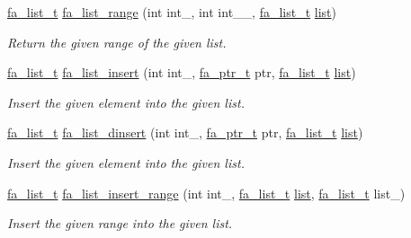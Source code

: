 \begin{DoxyCompactItemize}
\hyperlink{group___fa_list_ga35ecb12ab934ded0cce0bcf28e3bc5d2}{fa\-\_\-list\-\_\-t} \hyperlink{group___fa_list_ga05dc645dd5250b06e8c2957e9e04a2cc}{fa\-\_\-list\-\_\-range} (int int\-\_\-, int int\-\_\-\-\_\-, \hyperlink{group___fa_list_ga35ecb12ab934ded0cce0bcf28e3bc5d2}{fa\-\_\-list\-\_\-t} \hyperlink{literals_8h_a4ddd63dfcfec2b4d5741a56aa6003c76}{list})
\begin{DoxyCompactList}\small\item\em Return the given range of the given list. \end{DoxyCompactList}\item 
\hyperlink{group___fa_list_ga35ecb12ab934ded0cce0bcf28e3bc5d2}{fa\-\_\-list\-\_\-t} \hyperlink{group___fa_list_gaf1b604aca05bc10ba88543868ea48f7a}{fa\-\_\-list\-\_\-insert} (int int\-\_\-, \hyperlink{group___fa_ga915ddeae99ad7568b273d2b876425197}{fa\-\_\-ptr\-\_\-t} ptr, \hyperlink{group___fa_list_ga35ecb12ab934ded0cce0bcf28e3bc5d2}{fa\-\_\-list\-\_\-t} \hyperlink{literals_8h_a4ddd63dfcfec2b4d5741a56aa6003c76}{list})
\begin{DoxyCompactList}\small\item\em Insert the given element into the given list. \end{DoxyCompactList}\item 
\hyperlink{group___fa_list_ga35ecb12ab934ded0cce0bcf28e3bc5d2}{fa\-\_\-list\-\_\-t} \hyperlink{group___fa_list_ga331555c4727341fec8f2f0df6a0e2088}{fa\-\_\-list\-\_\-dinsert} (int int\-\_\-, \hyperlink{group___fa_ga915ddeae99ad7568b273d2b876425197}{fa\-\_\-ptr\-\_\-t} ptr, \hyperlink{group___fa_list_ga35ecb12ab934ded0cce0bcf28e3bc5d2}{fa\-\_\-list\-\_\-t} \hyperlink{literals_8h_a4ddd63dfcfec2b4d5741a56aa6003c76}{list})
\begin{DoxyCompactList}\small\item\em Insert the given element into the given list. \end{DoxyCompactList}\item 
\hyperlink{group___fa_list_ga35ecb12ab934ded0cce0bcf28e3bc5d2}{fa\-\_\-list\-\_\-t} \hyperlink{group___fa_list_gae4f6685768da2c00dd24e4bf7c08621a}{fa\-\_\-list\-\_\-insert\-\_\-range} (int int\-\_\-, \hyperlink{group___fa_list_ga35ecb12ab934ded0cce0bcf28e3bc5d2}{fa\-\_\-list\-\_\-t} \hyperlink{literals_8h_a4ddd63dfcfec2b4d5741a56aa6003c76}{list}, \hyperlink{group___fa_list_ga35ecb12ab934ded0cce0bcf28e3bc5d2}{fa\-\_\-list\-\_\-t} list\-\_\-)
\begin{DoxyCompactList}\small\item\em Insert the given range into the given list. \end{DoxyCompactList}\item 

\end{DoxyCompactItemize}
